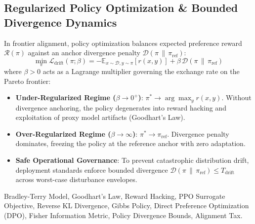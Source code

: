 \subsection{Regularized Policy Optimization \& Bounded Divergence Dynamics}
In frontier alignment, policy optimization balances expected preference reward $\mathcal{R}(\pi)$ against an anchor divergence penalty $\mathcal{D}(\pi \,\|\, \pi_{\mathrm{ref}})$:
\begin{equation}
\min_{\pi} \mathcal{L}_{\mathrm{drift}}(\pi; \beta) = -\mathbb{E}_{x \sim \mathcal{D}, y \sim \pi}[r(x, y)] + \beta \, \mathcal{D}(\pi \,\|\, \pi_{\mathrm{ref}})
\end{equation}
where $\beta > 0$ acts as a Lagrange multiplier governing the exchange rate on the Pareto frontier:
\begin{itemize}[noitemsep]
    \item \textbf{Under-Regularized Regime ($\beta \to 0^+$)}: $\pi^* \to \arg\max_y r(x, y)$. Without divergence anchoring, the policy degenerates into reward hacking and exploitation of proxy model artifacts (Goodhart's Law).
    \item \textbf{Over-Regularized Regime ($\beta \to \infty$)}: $\pi^* \to \pi_{\mathrm{ref}}$. Divergence penalty dominates, freezing the policy at the reference anchor with zero adaptation.
    \item \textbf{Safe Operational Governance}: To prevent catastrophic distribution drift, deployment standards enforce bounded divergence $\mathcal{D}(\pi \,\|\, \pi_{\mathrm{ref}}) \le T_{\mathrm{drift}}$ across worst-case disturbance envelopes.
\end{itemize}

\begin{remark}
Bradley-Terry Model, Goodhart's Law, Reward Hacking, PPO Surrogate Objective, Reverse KL Divergence, Gibbs Policy, Direct Preference Optimization (DPO), Fisher Information Metric, Policy Divergence Bounds, Alignment Tax.
\end{remark}
